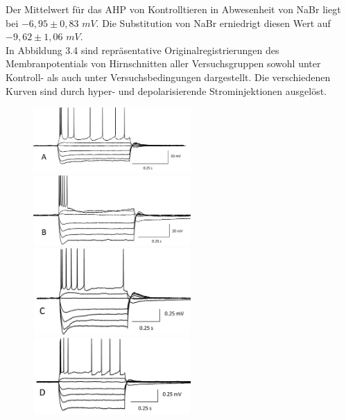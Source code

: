 \documentclass[a4paper,11pt]{report}
\begin{document}
{Der Mittelwert für das AHP von Kontrolltieren in Abwesenheit von NaBr liegt bei $-6,95 \pm 0,83$ $mV$. Die Substitution von NaBr erniedrigt diesen Wert auf $-9,62 \pm 1,06$ $mV$.\\

In Abbildung 3.4 sind repräsentative Originalregistrierungen des Membranpotentials von Hirnschnitten aller Versuchsgruppen sowohl unter Kontroll- als auch unter Versuchsbedingungen dargestellt. Die verschiedenen Kurven sind durch hyper- und depolarisierende Strominjektionen ausgelöst.

\begin{figure} [H]
\begin{center}

\includegraphics[width=6cm]{Abbildungen/membraneigenschaften/membraneigenschaften_k_c}
\includegraphics[width=6cm]{Abbildungen/membraneigenschaften/membraneigenschaften_k_br}
\includegraphics[width=6cm]{Abbildungen/membraneigenschaften/membraneigenschaften_p_c}
\includegraphics[width=6cm]{Abbildungen/membraneigenschaften/membraneigenschaften_p_br}


\end{center}
\end{figure}}
\end{document}
